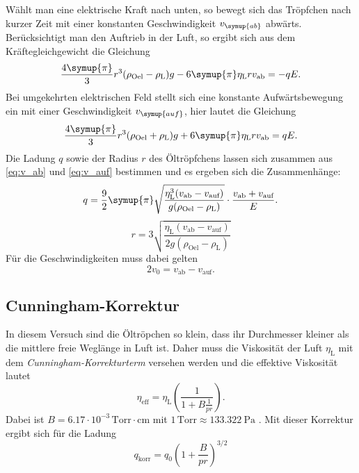Wählt man eine elektrische Kraft nach unten, so bewegt sich das Tröpfchen nach kurzer Zeit mit einer konstanten
Geschwindigkeit $v_{\symup{ab}}$ abwärts. Berücksichtigt man den Auftrieb in der Luft, so ergibt sich
aus dem Kräftegleichgewicht die Gleichung
\begin{equation}
    \label{eq:v_ab}
    \frac{4\symup{\pi}}{3}r^3(\rho_\text{Oel}-\rho_\text{L})g - 6\symup{\pi}\eta_\text{L}rv_{\text{ab}} = -qE.
\end{equation}
Bei umgekehrten elektrischen Feld stellt sich eine konstante Aufwärtsbewegung ein mit einer Geschwindigkeit $v_{\symup{auf}}$,
hier lautet die Gleichung
\begin{equation}
    \label{eq:v_auf}
    \frac{4\symup{\pi}}{3}r^3(\rho_\text{Oel}+\rho_\text{L})g + 6\symup{\pi}\eta_\text{L}rv_{\text{ab}} = qE.
\end{equation}
Die Ladung $q$ sowie der Radius $r$ des Öltröpfchens lassen sich zusammen aus \eqref{eq:v_ab} und \eqref{eq:v_auf}
bestimmen und es ergeben sich die Zusammenhänge:
\begin{equation}
    \label{eq:Ladung}
    q = \frac{9}{2} \symup{\pi} \sqrt{\frac{\eta_\text{L}^3(v_\text{ab} - v_\text{auf})}{g(\rho_\text{Oel}- \rho_\text{L})}} \cdot \frac{v_\text{ab} + v_\text{auf}}{E}.
\end{equation}
\begin{equation}
    \label{eq:Radius}
    r = 3\sqrt{\frac{\eta_\text{L}(v_\text{ab} - v_\text{auf})}{2g(\rho_\text{Oel}- \rho_\text{L})}}
\end{equation}
Für die Geschwindigkeiten muss dabei gelten
\begin{equation}
    \label{eq:Geschwindigkeiten}
    2v_0 = v_\text{ab} - v_\text{auf}.
\end{equation}

\subsection{Cunningham-Korrektur}
In diesem Versuch sind die Öltröpchen so klein, dass ihr Durchmesser kleiner als die mittlere freie Weglänge
in Luft ist. Daher muss die Viskosität der Luft $\eta_{\text{L}}$ mit dem
\textit{Cunningham-Korrekturterm} versehen werden und die effektive Viskosität lautet
\begin{equation*}
    \eta_\text{eff} = \eta_\text{L} \left(\frac{1}{1 + B \frac{1}{pr}}\right).
\end{equation*}
Dabei ist $B=6.17\cdot10^{-3}\,\text{Torr}\cdot\text{cm}$ \cite{v503} mit $1\,\text{Torr}\approx\qty{133.322}{\pascal}$ \cite{Torr}.
Mit dieser Korrektur ergibt sich für die Ladung
\begin{equation}
\label{eqn:q_korrigiert}
    q_\text{korr} = q_0 \left(1+ \frac{B}{pr}\right)^{3/2}
\end{equation}
